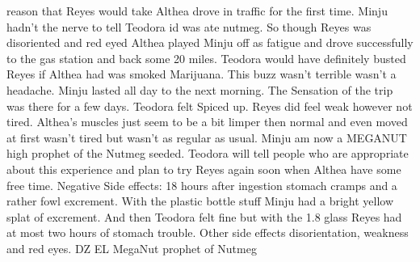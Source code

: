 \documentclass[12pt]{book}
\begin{document}
reason that Reyes would take Althea drove in traffic for the first time. Minju hadn't the nerve to tell Teodora id was ate nutmeg. So though Reyes was disoriented and red eyed Althea played Minju off as fatigue and drove successfully to the gas station and back some 20 miles. Teodora would have definitely busted Reyes if Althea had was smoked Marijuana. This buzz wasn't terrible wasn't a headache. Minju lasted all day to the next morning. The Sensation of the trip was there for a few days. Teodora felt Spiced up. Reyes did feel weak however not tired. Althea's muscles just seem to be a bit limper then normal and even moved at first wasn't tired but wasn't as regular as usual. Minju am now a MEGANUT high prophet of the Nutmeg seeded. Teodora will tell people who are appropriate about this experience and plan to try Reyes again soon when Althea have some free time. Negative Side effects: 18 hours after ingestion stomach cramps and a rather fowl excrement. With the plastic bottle stuff Minju had a bright yellow splat of excrement. And then Teodora felt fine but with the 1.8 glass Reyes had at most two hours of stomach trouble. Other side effects disorientation, weakness and red eyes. DZ EL MegaNut prophet of Nutmeg
\end{document}
